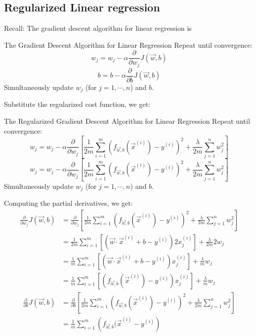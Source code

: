 \documentclass[12pt,a4paper]{article}
\begin{document}
\subsection{Regularized Linear regression}
\quad Recall: The gradient descent algorithm for linear regression is
\begin{rmkbox}{The Gradient Descent Algorithm for Linear Regression}
	Repeat until convergence: 
	$$w_j=w_j-\alpha\frac{\partial}{\partial w_j}J(\vec{w},b)$$
	$$b=b-\alpha\frac{\partial}{\partial b}J(\vec{w},b)$$
	Simultaneously update $w_j$ (for $j=1,\cdots,n$) and $b$.
\end{rmkbox}

Substitute the regularized cost function, we get: 
\begin{rmkbox}{The Regularized Gradient Descent Algorithm for Linear Regression}
	Repeat until convergence: 
	$$w_j=w_j-\alpha\frac{\partial}{\partial w_j}\left[\frac{1}{2m}\sum_{i=1}^m\left(f_{\vec{w},b}(\vec{x}^{(i)})-y^{(i)}\right)^2+\frac{\lambda}{2m}\sum_{j=1}^nw_j^2\right]$$
	$$w_j=w_j-\alpha\frac{\partial}{\partial w_j}\left[\frac{1}{2m}\sum_{i=1}^m\left(f_{\vec{w},b}(\vec{x}^{(i)})-y^{(i)}\right)^2+\frac{\lambda}{2m}\sum_{j=1}^nw_j^2\right]$$
	Simultaneously update $w_j$ (for $j=1,\cdots,n$) and $b$.
\end{rmkbox}

Computing the partial derivatives, we get: 
$$\begin{aligned}
	\frac{\partial}{\partial w_j}J(\vec{w},b)&=\frac{\partial}{\partial w_j}\left[\frac{1}{2m}\sum_{i=1}^m\left(f_{\vec{w},b}(\vec{x}^{(i)})-y^{(i)}\right)^2+\frac{\lambda}{2m}\sum_{j=1}^nw_j^2\right]\\
	&=\frac{1}{2m}\sum_{i=1}^m\left[(\vec{w}\cdot\vec{x}^{(i)}+b-y^{(i)})2x_j^{(i)}\right]+\frac{\lambda}{2m}2w_j\\
	&=\frac{1}{m}\sum_{i=1}^m\left[(\vec{w}\cdot\vec{x}^{(i)}+b-y^{(i)})x_j^{(i)}\right]+\frac{\lambda}{m}w_j\\
	&=\frac{1}{m}\sum_{i=1}^m\left[(f_{\vec{w},b}(\vec{x}^{(i)})-y^{(i)})x_j^{(i)}\right]+\frac{\lambda}{m}w_j
\end{aligned}$$
$$\begin{aligned}
	\frac{\partial}{\partial b}J(\vec{w},b)
	&=\frac{\partial}{\partial b}\left[\frac{1}{2m}\sum_{i=1}^m\left(f_{\vec{w},b}(\vec{x}^{(i)})-y^{(i)}\right)^2+\frac{\lambda}{2m}\sum_{j=1}^nw_j^2\right]\\
	&=\frac{1}{m}\sum_{i=1}^m\left(f_{\vec{w},b}(\vec{x}^{(i)}-y^{(i)}\right)
\end{aligned}$$
\end{document}
